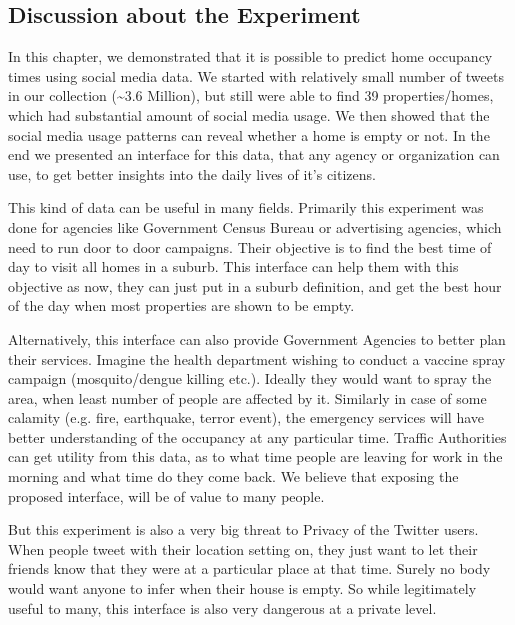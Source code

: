 \documentclass[12pt]{report}
\theoremstyle{named}
\begin{document}
\subsection{Discussion about the Experiment}
In this chapter, we demonstrated that it is possible to predict home occupancy times using social media data. We started with relatively small number of tweets in our collection (\textasciitilde 3.6 Million), but still were able to find 39 properties/homes, which had substantial amount of social media usage. We then showed that the social media usage patterns can reveal whether a home is empty or not. In the end we presented an interface for this data, that any agency or organization can use, to get better insights into the daily lives of it's citizens. 

This kind of data can be useful in many fields. Primarily this experiment was done for agencies like Government Census Bureau or advertising agencies, which need to run door to door campaigns. Their objective is to find the best time of day to visit all homes in a suburb. This interface can help them with this objective as now, they can just put in a suburb definition, and get the best hour of the day when most properties are shown to be empty.

Alternatively, this interface can also provide Government Agencies to better plan their services. Imagine the health department wishing to conduct a vaccine spray campaign (mosquito/dengue killing etc.). Ideally they would want to spray the area, when least number of people are affected by it. Similarly in case of some calamity (e.g. fire, earthquake, terror event), the emergency services will have better understanding of the occupancy at any particular time. Traffic Authorities can get utility from this data, as to what time people are leaving for work in the morning and what time do they come back. We believe that exposing the proposed interface, will be of value to many people. 

But this experiment is also a very big threat to Privacy of the Twitter users. When people tweet with their location setting on, they just want to let their friends know that they were at a particular place at that time. Surely no body would want anyone to infer when their house is empty. So while legitimately useful to many, this interface is also very dangerous at a private level.
\end{document}
